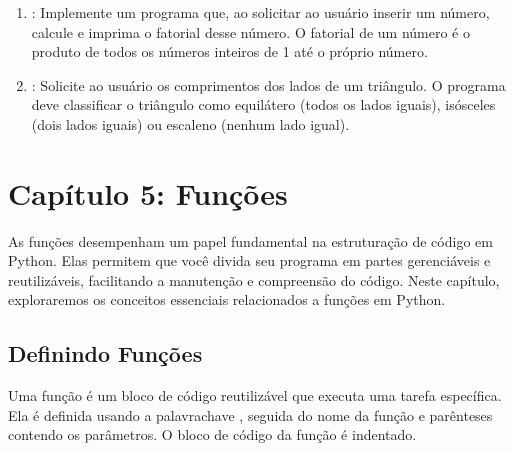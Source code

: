 \documentclass[letterpaper,10pt,english]{jupyterBook}
\begin{document}
\begin{enumerate}
\item {} 
\sphinxAtStartPar
{}:
Implemente um programa que, ao solicitar ao usuário inserir um número, calcule e imprima o fatorial desse número. O fatorial de um número é o produto de todos os números inteiros de 1 até o próprio número.

\item {} 
\sphinxAtStartPar
{}:
Solicite ao usuário os comprimentos dos lados de um triângulo. O programa deve classificar o triângulo como equilátero (todos os lados iguais), isósceles (dois lados iguais) ou escaleno (nenhum lado igual).

\end{enumerate}

\sphinxstepscope


\chapter{Capítulo 5: Funções}
\label{\detokenize{chapters/ch5/ch5:capitulo-5-funcoes}}\label{\detokenize{chapters/ch5/ch5::doc}}
\sphinxAtStartPar
As funções desempenham um papel fundamental na estruturação de código em Python. Elas permitem que você divida seu programa em partes gerenciáveis e reutilizáveis, facilitando a manutenção e compreensão do código. Neste capítulo, exploraremos os conceitos essenciais relacionados a funções em Python.


\section{Definindo Funções}
\label{\detokenize{chapters/ch5/ch5:definindo-funcoes}}
\sphinxAtStartPar
Uma função é um bloco de código reutilizável que executa uma tarefa específica. Ela é definida usando a palavra\sphinxhyphen{}chave , seguida do nome da função e parênteses contendo os parâmetros. O bloco de código da função é indentado.

\sphinxAtStartPar
{}

\begin{sphinxVerbatim}[commandchars=\\\{\}]
 


\end{sphinxVerbatim}
\end{document}
